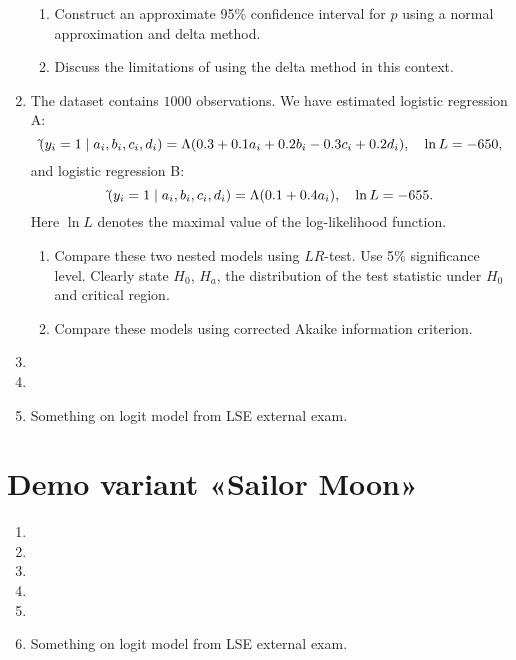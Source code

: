 \documentclass[12pt]{article}
\let\P\relax
\DeclareMathOperator{\P}{\mathbb{P}}
\begin{document}
\begin{enumerate}
\begin{enumerate}
        \item Construct an approximate 95\% confidence interval for $p$ using a normal approximation and delta method.
    
        \item Discuss the limitations of using the delta method in this context.
    \end{enumerate}
    \item The dataset contains $1000$ observations. 
    We have estimated logistic regression A:
    \[
    \hat\P(y_i = 1 \mid a_i, b_i, c_i, d_i) = \Lambda(0.3 + 0.1 a_i + 0.2 b_i - 0.3 c_i + 0.2 d_i), \quad \ln L = -650,
    \]
    and logistic regression B:
    \[
    \hat\P(y_i = 1 \mid a_i, b_i, c_i, d_i) = \Lambda(0.1 + 0.4 a_i), \quad \ln L = -655.
    \]
    Here $\ln L$ denotes the maximal value of the log-likelihood function. 
    \begin{enumerate}
        \item Compare these two nested models using $LR$-test. 
        Use 5\% significance level.
        Clearly state $H_0$, $H_a$, the distribution of the test statistic under $H_0$ and critical region.
        \item Compare these models using corrected Akaike information criterion. 
    \end{enumerate}


    \item 
    \item 

    \item Something on logit model from LSE external exam. 
\end{enumerate}


\section*{Demo variant «Sailor Moon»}
\begin{enumerate}
    \item 
    \item 
    \item 
    \item 
    \item 

    \item Something on logit model from LSE external exam. 

\end{enumerate}
\end{document}
